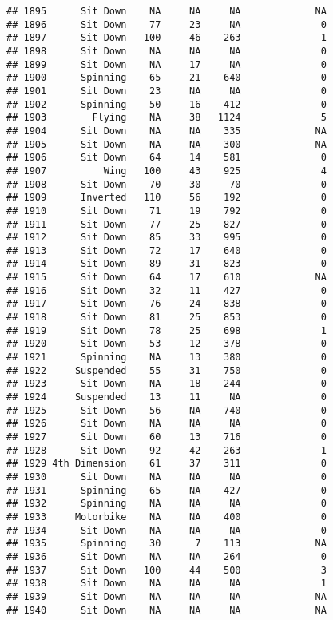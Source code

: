 \documentclass[
]{article}
\begin{document}
\begin{verbatim}
## 1895      Sit Down    NA     NA     NA             NA
## 1896      Sit Down    77     23     NA              0
## 1897      Sit Down   100     46    263              1
## 1898      Sit Down    NA     NA     NA              0
## 1899      Sit Down    NA     17     NA              0
## 1900      Spinning    65     21    640              0
## 1901      Sit Down    23     NA     NA              0
## 1902      Spinning    50     16    412              0
## 1903        Flying    NA     38   1124              5
## 1904      Sit Down    NA     NA    335             NA
## 1905      Sit Down    NA     NA    300             NA
## 1906      Sit Down    64     14    581              0
## 1907          Wing   100     43    925              4
## 1908      Sit Down    70     30     70              0
## 1909      Inverted   110     56    192              0
## 1910      Sit Down    71     19    792              0
## 1911      Sit Down    77     25    827              0
## 1912      Sit Down    85     33    995              0
## 1913      Sit Down    72     17    640              0
## 1914      Sit Down    89     31    823              0
## 1915      Sit Down    64     17    610             NA
## 1916      Sit Down    32     11    427              0
## 1917      Sit Down    76     24    838              0
## 1918      Sit Down    81     25    853              0
## 1919      Sit Down    78     25    698              1
## 1920      Sit Down    53     12    378              0
## 1921      Spinning    NA     13    380              0
## 1922     Suspended    55     31    750              0
## 1923      Sit Down    NA     18    244              0
## 1924     Suspended    13     11     NA              0
## 1925      Sit Down    56     NA    740              0
## 1926      Sit Down    NA     NA     NA              0
## 1927      Sit Down    60     13    716              0
## 1928      Sit Down    92     42    263              1
## 1929 4th Dimension    61     37    311              0
## 1930      Sit Down    NA     NA     NA              0
## 1931      Spinning    65     NA    427              0
## 1932      Spinning    NA     NA     NA              0
## 1933     Motorbike    NA     NA    400              0
## 1934      Sit Down    NA     NA     NA              0
## 1935      Spinning    30      7    113             NA
## 1936      Sit Down    NA     NA    264              0
## 1937      Sit Down   100     44    500              3
## 1938      Sit Down    NA     NA     NA              1
## 1939      Sit Down    NA     NA     NA             NA
## 1940      Sit Down    NA     NA     NA             NA

\end{verbatim}
\end{document}
